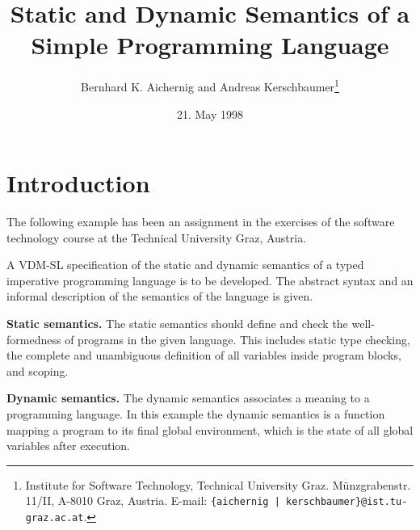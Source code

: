 \documentclass[]{article}
\title{Static and Dynamic Semantics of a Simple Programming Language}
\author{Bernhard K. Aichernig and Andreas Kerschbaumer\footnote{Institute for
Software Technology, Technical University Graz. M\"unzgrabenstr. 11/II, 
A-8010 Graz, Austria. E-mail: {\tt \{aichernig | kerschbaumer\}@ist.tu-graz.ac.at}.}}
\date{21. May 1998}
\begin{document}
\maketitle

\section{Introduction}
The following example has been an assignment in the
exercises of the software technology course at the Technical 
University Graz, Austria. 

A VDM-SL specification of the static and dynamic semantics of a
typed imperative programming language is to be developed. The abstract
syntax and an informal description of the semantics of the language
is given. 

{\bf Static semantics.} The static semantics should define and
check the well-formedness of programs in the given language. This
includes static type checking, the complete and unambiguous 
definition of all variables inside program blocks, and scoping.

{\bf Dynamic semantics.} The dynamic semantics associates a 
meaning to a programming language. In this example the dynamic 
semantics is a function mapping a program to its final global
environment, which is the  state of all global 
variables after execution. 






\end{document}
